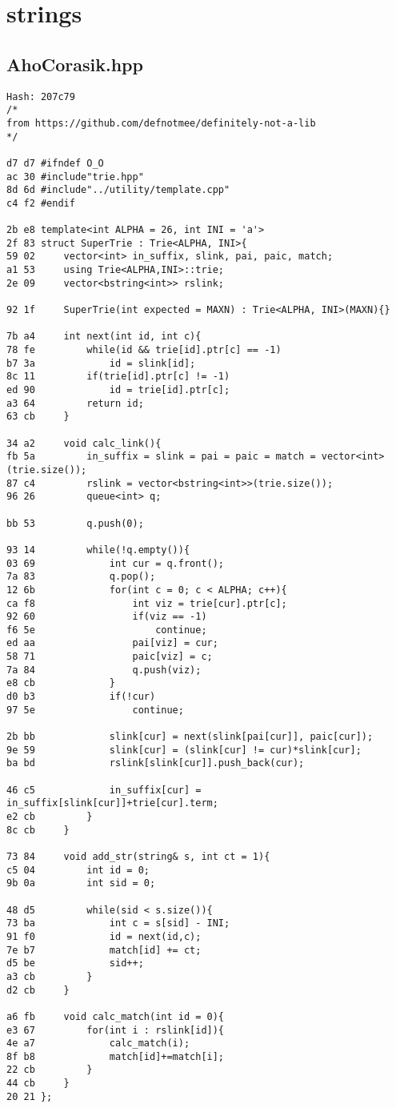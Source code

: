 \documentclass[11pt, a4paper, twoside]{article}
\begin{document}
%
%

\section{strings}

\subsection{AhoCorasik.hpp}
\begin{lstlisting}
Hash: 207c79
/*
from https://github.com/defnotmee/definitely-not-a-lib
*/

d7 d7 #ifndef O_O
ac 30 #include"trie.hpp"
8d 6d #include"../utility/template.cpp"
c4 f2 #endif

2b e8 template<int ALPHA = 26, int INI = 'a'>
2f 83 struct SuperTrie : Trie<ALPHA, INI>{
59 02     vector<int> in_suffix, slink, pai, paic, match;
a1 53     using Trie<ALPHA,INI>::trie;
2e 09     vector<bstring<int>> rslink;
      
92 1f     SuperTrie(int expected = MAXN) : Trie<ALPHA, INI>(MAXN){}
      
7b a4     int next(int id, int c){
78 fe         while(id && trie[id].ptr[c] == -1)
b7 3a             id = slink[id];
8c 11         if(trie[id].ptr[c] != -1)
ed 90             id = trie[id].ptr[c];
a3 64         return id;
63 cb     }
      
34 a2     void calc_link(){
fb 5a         in_suffix = slink = pai = paic = match = vector<int>(trie.size());
87 c4         rslink = vector<bstring<int>>(trie.size());
96 26         queue<int> q;
      
bb 53         q.push(0);
      
93 14         while(!q.empty()){
03 69             int cur = q.front();
7a 83             q.pop();
12 6b             for(int c = 0; c < ALPHA; c++){
ca f8                 int viz = trie[cur].ptr[c];
92 60                 if(viz == -1)
f6 5e                     continue;
ed aa                 pai[viz] = cur;
58 71                 paic[viz] = c;
7a 84                 q.push(viz);
e8 cb             }
d0 b3             if(!cur)
97 5e                 continue;
      
2b bb             slink[cur] = next(slink[pai[cur]], paic[cur]);
9e 59             slink[cur] = (slink[cur] != cur)*slink[cur];
ba bd             rslink[slink[cur]].push_back(cur);
      
46 c5             in_suffix[cur] = in_suffix[slink[cur]]+trie[cur].term;
e2 cb         }
8c cb     }
      
73 84     void add_str(string& s, int ct = 1){
c5 04         int id = 0;
9b 0a         int sid = 0;
      
48 d5         while(sid < s.size()){
73 ba             int c = s[sid] - INI;
91 f0             id = next(id,c);
7e b7             match[id] += ct;
d5 be             sid++;
a3 cb         }
d2 cb     }
      
a6 fb     void calc_match(int id = 0){
e3 67         for(int i : rslink[id]){
4e a7             calc_match(i);
8f b8             match[id]+=match[i];
22 cb         }
44 cb     }
20 21 };
\end{lstlisting}
\end{document}
